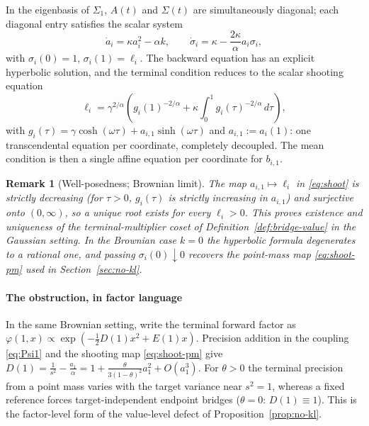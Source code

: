 \documentclass[letterpaper,10pt,conference]{IEEEtran}
\newtheorem{remark}{Remark}
\begin{document}
	In the eigenbasis of $\Sigma_1$, $A(t)$ and $\Sigma(t)$ are simultaneously
	diagonal; each diagonal entry satisfies the scalar system
	\begin{equation}
		\label{eq:scalar}
		\dot a_i=\kappa a_i^2-\alpha k,\qquad
		\dot\sigma_i=\kappa-\frac{2\kappa}{\alpha}a_i\sigma_i,
	\end{equation}
	with $\sigma_i(0)=1$, $\sigma_i(1)=\ell_i$. The backward equation has an
	explicit hyperbolic solution, and the terminal condition reduces to the scalar
	shooting equation
	\begin{equation}
		\label{eq:shoot}
		\ell_i=\gamma^{2/\alpha}\left(g_i(1)^{-2/\alpha}
		+\kappa\int_0^1 g_i(\tau)^{-2/\alpha}\,d\tau\right),
	\end{equation}
	with $g_i(\tau)=\gamma\cosh(\omega\tau)+a_{i,1}\sinh(\omega\tau)$ and
	$a_{i,1}:=a_i(1)$: one transcendental equation per coordinate, completely
	decoupled. The mean condition is then a single affine equation per coordinate
	for $b_{i,1}$.
	
	\begin{remark}[Well-posedness; Brownian limit]
		\label{rem:shoot-wp}
		The map $a_{i,1}\mapsto\ell_i$ in \eqref{eq:shoot} is strictly decreasing (for $\tau>0$, $g_i(\tau)$ is strictly increasing in $a_{i,1}$) and surjective onto $(0,\infty)$, so a unique root exists for
		every $\ell_i>0$. This
		proves existence and uniqueness of the terminal-multiplier coset of
		Definition~\ref{def:bridge-value} in the Gaussian setting. In the Brownian
		case $k=0$ the hyperbolic formula degenerates to a rational one, and
		passing $\sigma_i(0)\downarrow0$ recovers the point-mass map
		\eqref{eq:shoot-pm} used in Section~\ref{sec:no-kl}.
	\end{remark}
	
	\paragraph*{The obstruction, in factor language}
	In the same Brownian setting, write the terminal forward factor as
	$\varphi(1,x)\propto\exp(-\tfrac12 D(1)x^2+E(1)x)$. Precision addition in the
	coupling \eqref{eq:Psi1} and the shooting map \eqref{eq:shoot-pm} give
	$D(1)=\frac{1}{s^2}-\frac{a_1}{\alpha}
	=1+\frac{\theta}{3(1-\theta)^2}a_1^2+O(a_1^3)$. For $\theta>0$ the terminal
	precision from a point mass varies with the target variance near $s^2=1$,
	whereas a fixed reference forces target-independent endpoint bridges
	($\theta=0$: $D(1)\equiv1$). This is the factor-level form of the value-level
	defect of Proposition~\ref{prop:no-kl}.
	
\end{document}

